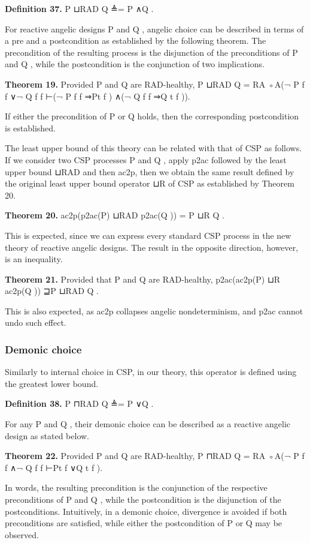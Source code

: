 \documentclass[11pt]{article}
\begin{document}
\noindent\textbf{Definition 37.} P ⊔RAD Q ≜= P ∧Q .


For reactive angelic designs P and Q , angelic choice can be described in terms of a pre and a postcondition as established by the following theorem. The precondition of the resulting process is the disjunction of the preconditions of P and Q , while the postcondition is the conjunction of two implications.

\noindent\textbf{Theorem 19.} Provided P and Q are RAD-healthy, P ⊔RAD Q = RA ◦A(¬ P f f ∨¬ Q f f ⊢(¬ P f f ⇒Pt f ) ∧(¬ Q f f ⇒Q t f )).


If either the precondition of P or Q holds, then the corresponding postcondition is established.

The least upper bound of this theory can be related with that of CSP as follows. If we consider two CSP processes P and Q , apply p2ac followed by the least upper bound ⊔RAD and then ac2p, then we obtain the same result defined by the original least upper bound operator ⊔R of CSP as established by Theorem 20.

\noindent\textbf{Theorem 20.} ac2p(p2ac(P) ⊔RAD p2ac(Q )) = P ⊔R Q .


This is expected, since we can express every standard CSP process in the new theory of reactive angelic designs. The result in the opposite direction, however, is an inequality.

\noindent\textbf{Theorem 21.} Provided that P and Q are RAD-healthy, p2ac(ac2p(P) ⊔R ac2p(Q )) ⊒P ⊔RAD Q .


This is also expected, as ac2p collapses angelic nondeterminism, and p2ac cannot undo such effect.

\subsubsection{Demonic choice}
Similarly to internal choice in CSP, in our theory, this operator is defined using the greatest lower bound.

\noindent\textbf{Definition 38.} P ⊓RAD Q ≜= P ∨Q .


For any P and Q , their demonic choice can be described as a reactive angelic design as stated below.

\noindent\textbf{Theorem 22.} Provided P and Q are RAD-healthy, P ⊓RAD Q = RA ◦A(¬ P f f ∧¬ Q f f ⊢Pt f ∨Q t f ).


In words, the resulting precondition is the conjunction of the respective preconditions of P and Q , while the postcondition is the disjunction of the postconditions. Intuitively, in a demonic choice, divergence is avoided if both preconditions are satisfied, while either the postcondition of P or Q may be observed.
\end{document}
